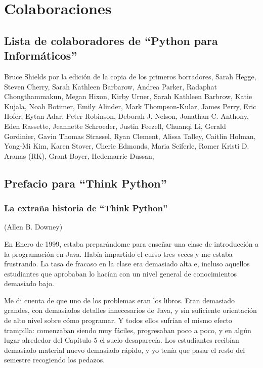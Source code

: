 
\chapter{Colaboraciones}
\section*{Lista de colaboradores de ``Python para Informáticos''}

Bruce Shields por la edición de la copia de los primeros borradores,
Sarah Hegge,
Steven Cherry,
Sarah Kathleen Barbarow,
Andrea Parker,
Radaphat Chongthammakun,
Megan Hixon,
Kirby Urner,
Sarah Kathleen Barbrow,
Katie Kujala,
Noah Botimer,
Emily Alinder,
Mark Thompson-Kular,
James Perry,
Eric Hofer,
Eytan Adar,
Peter Robinson,
Deborah J. Nelson,
Jonathan C. Anthony,
Eden Rassette,
Jeannette Schroeder,
Justin Feezell,
Chuanqi Li,
Gerald Gordinier,
Gavin Thomas Strassel,
Ryan Clement,
Alissa Talley,
Caitlin Holman,
Yong-Mi Kim,
Karen Stover,
Cherie Edmonds,
Maria Seiferle,
Romer Kristi D. Aranas (RK),
Grant Boyer,
Hedemarrie Dussan,


\section*{Prefacio para ``Think Python''}

\subsection*{La extraña historia de ``Think Python''}

(Allen B. Downey)

En Enero de 1999, estaba preparándome para enseñar una clase de introducción
a la programación en Java. Había impartido el curso tres veces y me estaba
frustrando. La tasa de fracaso en la clase era demasiado alta e, incluso
aquellos estudiantes que aprobaban lo hacían con un nivel general de conocimientos
demasiado bajo.

Me di cuenta de que uno de los problemas eran los libros.
Eran demasiado grandes, con demasiados detalles innecesarios de Java, y
sin suficiente orientación de alto nivel sobre cómo programar. Y todos ellos
sufrían el mismo efecto trampilla: comenzaban siendo muy fáciles,
progresaban poco a poco, y en algún lugar alrededor del Capítulo 5 el suelo
desaparecía. Los estudiantes recibían demasiado material nuevo demasiado rápido,
y yo tenía que pasar el resto del semestre recogiendo los pedazos.

